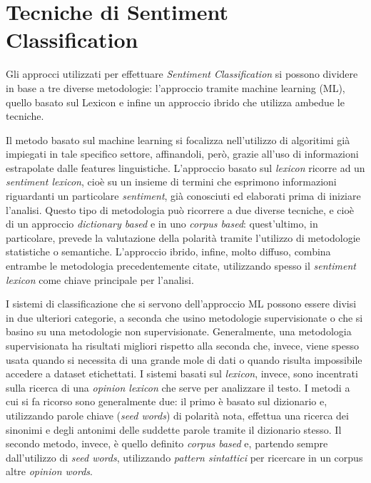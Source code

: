 \documentclass[a4paper,12pt,openright,twoside]{report}
\theoremstyle{definition}
\begin{document}
\section{Tecniche di Sentiment Classification}
Gli approcci utilizzati per effettuare \emph{Sentiment Classification}
si possono dividere in base a tre diverse metodologie: l'approccio tramite
machine learning (ML), quello basato sul Lexicon e infine un approccio ibrido
che utilizza ambedue le tecniche.

Il metodo basato sul machine learning si focalizza nell'utilizzo di algoritimi
già impiegati in tale specifico settore, affinandoli, però, grazie all'uso 
di informazioni estrapolate dalle features linguistiche.
L'approccio basato sul \emph{lexicon} ricorre ad un \emph{sentiment lexicon},
cioè su un insieme di termini che esprimono informazioni riguardanti un particolare
\emph{sentiment}, già conosciuti ed elaborati prima di iniziare l'analisi.
Questo tipo di metodologia può ricorrere a due diverse tecniche,
e cioè di 
un approccio \emph{dictionary based} e in uno \emph{corpus based}:
quest'ultimo, in particolare, prevede la valutazione della polarità
tramite l'utilizzo di metodologie statistiche o
semantiche.
L'approccio ibrido, infine, molto diffuso, combina entrambe le metodologia precedentemente
citate, utilizzando spesso il \emph{sentiment lexicon} come chiave principale per l'analisi.

I sistemi di classificazione che  si servono dell'approccio ML possono essere 
divisi in due ulteriori categorie, a seconda che usino metodologie supervisionate
o che si basino su una metodologie non supervisionate. Generalmente, una metodologia
supervisionata ha risultati migliori rispetto alla seconda che, invece,
viene spesso usata quando si necessita di una grande mole di dati o quando risulta
impossibile accedere a dataset etichettati.
I sistemi basati sul \emph{lexicon}, invece, sono incentrati sulla ricerca di una \emph{opinion lexicon}
che serve per analizzare il testo. I metodi a cui si fa ricorso sono generalmente due:
il primo è basato sul dizionario e, utilizzando parole chiave (\emph{seed words}) di polarità nota,
effettua una ricerca dei sinonimi e degli antonimi delle suddette parole tramite il dizionario stesso.
Il secondo metodo, invece, è quello definito \emph{corpus based} e, partendo sempre dall'utilizzo di
\emph{seed words}, utilizzando \emph{pattern sintattici} per 
ricercare in un corpus altre \emph{opinion words}.
\end{document}
